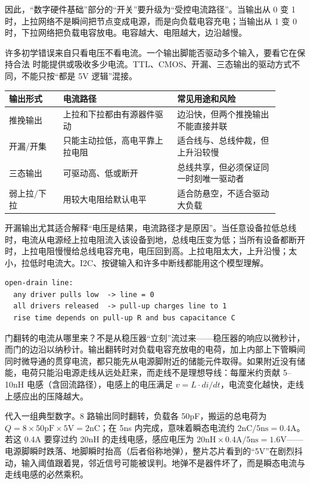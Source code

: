 因此，“数字硬件基础”部分的“开关”要升级为“受控电流路径”。当输出从 0 变 1 时，上拉网络不是瞬间把节点变成电源，而是向负载电容充电；当输出从 1 变 0 时，下拉网络把负载电容放电。电容越大、电阻越大，边沿越慢。

许多初学错误来自只看电压不看电流。一个输出脚能否驱动多个输入，要看它在保持合法  时能提供或吸收多少电流。TTL、CMOS、开漏、三态输出的驱动方式不同，不能只按“都是 5V 逻辑”混接。

\begin{longtable}{L{0.18\linewidth}L{0.38\linewidth}L{0.34\linewidth}}
\toprule
输出形式 & 电流路径 & 常见用途和风险 \\
\midrule
推挽输出 & 上拉和下拉都由有源器件驱动 & 边沿快，但两个推挽输出不能直接并联 \\\tablerowrule
开漏/开集 & 只能主动拉低，高电平靠上拉电阻 & 适合线与、总线仲裁，但上升沿较慢 \\\tablerowrule
三态输出 & 可驱动高、低或断开 & 总线共享，但必须保证同一时刻唯一驱动者 \\\tablerowrule
弱上拉/下拉 & 用较大电阻给默认电平 & 适合防悬空，不适合驱动大负载 \\
\bottomrule
\end{longtable}

开漏输出尤其适合解释“电压是结果，电流路径才是原因”。当任意设备拉低总线时，电流从电源经上拉电阻流入该设备到地，总线电压变为低；当所有设备都断开时，上拉电阻慢慢给总线电容充电，电压回到高。上拉电阻太大，上升沿慢；太小，拉低时电流大。I2C、按键输入和许多中断线都能用这个模型理解。

\begin{lstlisting}
open-drain line:
  any driver pulls low  -> line = 0
  all drivers released  -> pull-up charges line to 1
  rise time depends on pull-up R and bus capacitance C
\end{lstlisting}

门翻转的电流从哪里来？不是从稳压器“立刻”流过来——稳压器的响应以微秒计，而门的边沿以纳秒计。输出翻转时对负载电容充放电的电荷，加上内部上下管瞬间同时微导通的贯穿电流，都只能先从电源脚附近的储能元件取得。如果附近没有储能，电荷只能沿电源走线从远处赶来，而走线不是理想导线：每厘米约贡献 5–10nH 电感（含回流路径），电感上的电压满足 $v=L\cdot di/dt$，电流变化越快，走线上感应出的压降越大。

代入一组典型数字。8 路输出同时翻转，负载各 50pF，搬运的总电荷为 $Q=8\times50\mathrm{pF}\times5\mathrm{V}=2$nC；在 5ns 内完成，意味着瞬态电流约 $2\mathrm{nC}/5\mathrm{ns}=0.4$A。若这 0.4A 要穿过约 20nH 的走线电感，感应电压为 $20\mathrm{nH}\times0.4\mathrm{A}/5\mathrm{ns}=1.6$V——电源脚瞬时跌落、地脚瞬时抬高（后者俗称地弹），整片芯片看到的“5V”在剧烈抖动，输入阈值跟着晃，邻近信号可能被误判。地弹不是器件坏了，而是瞬态电流与走线电感的必然乘积。

